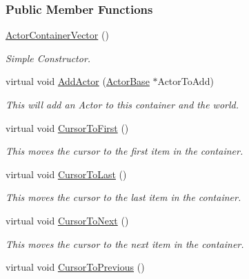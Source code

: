 \subsubsection*{Public Member Functions}
\begin{DoxyCompactItemize}
\item 
\hyperlink{classMezzanine_1_1ActorContainerVector_a1fcb63abbc8e5d30f3d274ba1798b604}{ActorContainerVector} ()
\begin{DoxyCompactList}\small\item\em Simple Constructor. \item\end{DoxyCompactList}\item 
virtual void \hyperlink{classMezzanine_1_1ActorContainerVector_a1341d51fa9ed279301eed579a2de79b2}{AddActor} (\hyperlink{classMezzanine_1_1ActorBase}{ActorBase} $\ast$ActorToAdd)
\begin{DoxyCompactList}\small\item\em This will add an Actor to this container and the world. \item\end{DoxyCompactList}\item 
virtual void \hyperlink{classMezzanine_1_1ActorContainerVector_a2b09e4eac9bc6392f47dd81fb7592ce3}{CursorToFirst} ()
\begin{DoxyCompactList}\small\item\em This moves the cursor to the first item in the container. \item\end{DoxyCompactList}\item 
virtual void \hyperlink{classMezzanine_1_1ActorContainerVector_ae80f9d94f009293528bf1b4251bc8ad0}{CursorToLast} ()
\begin{DoxyCompactList}\small\item\em This moves the cursor to the last item in the container. \item\end{DoxyCompactList}\item 
virtual void \hyperlink{classMezzanine_1_1ActorContainerVector_a04cce1784a09023cb9db8cbc60a60d0c}{CursorToNext} ()
\begin{DoxyCompactList}\small\item\em This moves the cursor to the next item in the container. \item\end{DoxyCompactList}\item 
virtual void \hyperlink{classMezzanine_1_1ActorContainerVector_abe0d1ce8c8f6a83a7ef3c340a605e767}{CursorToPrevious} ()

\end{DoxyCompactItemize}
